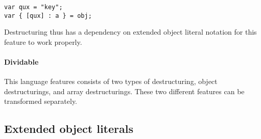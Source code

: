 \documentclass[10pt,a4paper]{article}
\begin{document}
\begin{lstlisting}
var qux = "key";
var { [qux] : a } = obj;
\end{lstlisting}

Destructuring thus has a dependency on extended object literal notation for this feature to work properly.

\paragraph{Dividable}
This language features consists of two types of destructuring, object destructurings, and array destructurings. These two different features can be transformed separately. 

\subsection{Extended object literals} \label{object-literals}

{}

\end{document}
